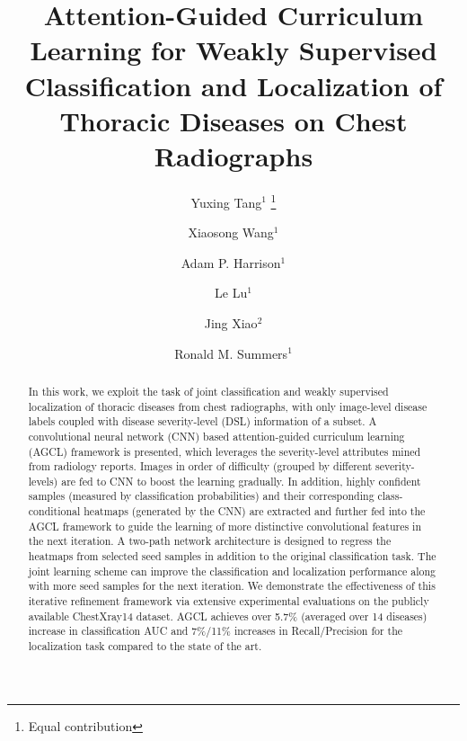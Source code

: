 \documentclass[runningheads,a4paper]{llncs}
\makeatletter
\newcommand{\printfnsymbol}[1]{%
  \textsuperscript{\@fnsymbol{#1}}%
}
\makeatother
\begin{document}
\mainmatter  %

\title{Attention-Guided Curriculum Learning for Weakly Supervised Classification and Localization of Thoracic Diseases on Chest Radiographs}


\author{Yuxing Tang$^1$
\thanks{Equal contribution}
\and Xiaosong Wang$^1$\printfnsymbol{1} \and Adam P. Harrison$^1$ \and Le Lu$^1$ \and Jing Xiao$^2$ \and Ronald M. Summers$^1$
}


\maketitle

\begin{abstract}
In this work, we exploit the task of joint classification and weakly supervised localization of thoracic diseases from chest radiographs, with only image-level disease labels coupled with disease severity-level (DSL) information of a subset. A convolutional neural network (CNN) based attention-guided curriculum learning (AGCL) framework is presented, which leverages the severity-level attributes mined from radiology reports. Images in order of difficulty (grouped by different severity-levels) are fed to CNN to boost the learning gradually. In addition, highly confident samples (measured by classification probabilities) and their corresponding class-conditional heatmaps (generated by the CNN) are extracted and further fed into the AGCL framework to guide the learning of more distinctive convolutional features in the next iteration. A two-path network architecture is designed to regress the heatmaps from selected seed samples in addition to the original classification task. The joint learning scheme can improve the classification and localization performance along with more seed samples for the next iteration. We demonstrate the effectiveness of this iterative refinement framework via extensive experimental evaluations on the publicly available ChestXray14 dataset. AGCL achieves over 5.7\% (averaged over 14 diseases) increase in classification AUC and 7\%/11\% increases in Recall/Precision for the localization task compared to the state of the art.

\end{abstract}
\end{document}
